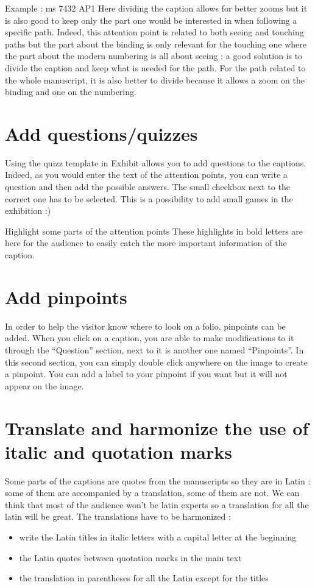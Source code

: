 \documentclass{article}
\begin{document}
    Example : ms 7432 AP1
    Here dividing the caption allows for better zooms but it is also good to keep only the part one would be interested in when following a specific path. Indeed, this attention point is related to both seeing and touching paths but the part about the binding is only relevant for the touching one where the part about the modern numbering is all about seeing : a good solution is to divide the caption and keep what is needed for the path. For the path related to the whole manuscript, it is also better to divide because it allows a zoom on the binding and one on the numbering. 


    \section{Add questions/quizzes}
    Using the quizz template in Exhibit allows you to add questions to the captions. Indeed, as you would enter the text of the attention points, you can write a question and then add the possible answers. The small checkbox next to the correct one has to be selected. This is a possibility to add small games in the exhibition :)

    Highlight some parts of the attention points
    These highlights in bold letters are here for the audience to easily catch the more important information of the caption.

    \section{Add pinpoints}
    In order to help the visitor know where to look on a folio, pinpoints can be added. When you click on a caption, you are able to make modifications to it through the “Question” section, next to it is another one named “Pinpoints”. In this second section, you can simply double click anywhere on the image to create a pinpoint. You can add a label to your pinpoint if you want but it will not appear on the image. 

    \section{Translate and harmonize the use of italic and quotation marks}
    Some parts of the captions are quotes from the manuscripts so they are in Latin : some of them are accompanied by a translation, some of them are not. We can think that most of the audience won’t be latin experts so a translation for all the latin will be great. 
    The translations have to be harmonized : 
    \begin{itemize}
        \item write the Latin titles in italic letters with a capital letter at the beginning
        \item the Latin quotes between quotation marks in the main text
        \item the translation in parentheses for all the Latin except for the titles
    \end{itemize}
\end{document}
